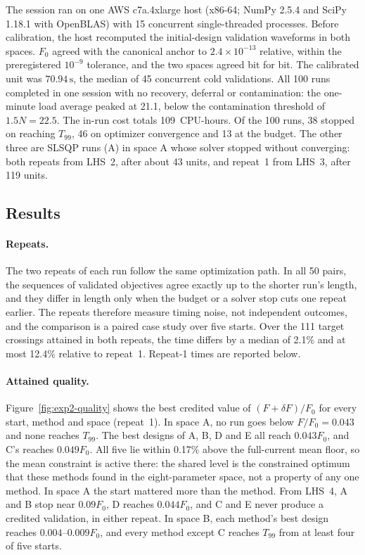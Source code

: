 The session ran on one AWS c7a.4xlarge host (x86-64; NumPy 2.5.4 and
SciPy 1.18.1 with OpenBLAS) with 15 concurrent single-threaded processes.
Before calibration, the host recomputed the initial-design validation
waveforms in both spaces. $F_0$ agreed with the canonical anchor to
$2.4\times10^{-13}$ relative, within the preregistered $10^{-9}$ tolerance,
and the two spaces agreed bit for bit. The calibrated unit was
$70.94\,\mathrm{s}$, the median of 45 concurrent cold validations. All 100
runs completed in one session with no recovery, deferral or contamination:
the one-minute load average peaked at 21.1, below the contamination
threshold of $1.5N=22.5$. The in-run cost totals 109~CPU-hours. Of the
100 runs, 38 stopped on reaching $T_{99}$, 46 on optimizer convergence and
13 at the budget. The other three are SLSQP runs (A) in space A whose
solver stopped without converging: both repeats from LHS~2, after about 43
units, and repeat~1 from LHS~3, after 119 units.

\subsection{Results}
\paragraph{Repeats.}
The two repeats of each run follow the same optimization path. In all 50
pairs, the sequences of validated objectives agree exactly up to the
shorter run's length, and they differ in length only when the budget or a
solver stop cuts one repeat earlier. The repeats therefore measure timing
noise, not independent outcomes, and the comparison is a paired case study
over five starts. Over the 111 target crossings attained in both repeats,
the time differs by a median of 2.1\% and at most 12.4\% relative to
repeat~1. Repeat-1 times are reported below.

\paragraph{Attained quality.}
Figure~\ref{fig:exp2-quality} shows the best credited value of
$(F+\delta F)/F_0$ for every start, method and space (repeat~1).
In space A, no run goes below $F/F_0=0.043$ and none reaches $T_{99}$.
The best designs of A, B, D and E all reach $0.043F_0$, and C's reaches
$0.049F_0$. All five lie within 0.17\% above the full-current mean floor,
so the mean constraint is active there: the shared level is the
constrained optimum that these methods found in the eight-parameter space,
not a property of any one method. In space A the start mattered more than
the method. From LHS~4, A and B stop near $0.09F_0$, D reaches $0.044F_0$,
and C and E never produce a credited validation, in either repeat. In
space B, each method's best design reaches $0.004$--$0.009F_0$, and every
method except C reaches $T_{99}$ from at least four of five starts.

